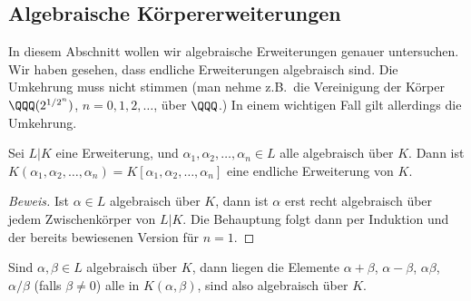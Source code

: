 \documentclass[12pt,a4paper,twoside]{article}
\begin{document}
\subsection{Algebraische K\"orpererweiterungen}
In diesem Abschnitt wollen wir algebraische Erweiterungen genauer untersuchen.
Wir haben gesehen, dass endliche Erweiterungen algebraisch sind. Die Umkehrung
muss nicht stimmen (man nehme z.B.\ die Vereinigung der K\"orper
$\QQQ(2^{1/2^n})$, $n=0,1,2,\dots$, \"uber $\QQQ$.) In einem wichtigen Fall
gilt allerdings die Umkehrung.
\begin{Lemma}
  Sei $L|K$ eine Erweiterung, und $\alpha_1,\alpha_2,\dots,\alpha_n\in L$ alle
  algebraisch \"uber $K$. Dann ist
  $K(\alpha_1,\alpha_2,\dots,\alpha_n)=K[\alpha_1,\alpha_2,\dots,\alpha_n]$
  eine endliche Erweiterung von $K$.
\end{Lemma}
\begin{proof}[Beweis]
  Ist $\alpha\in L$ algebraisch \"uber $K$, dann ist $\alpha$ erst recht
  algebraisch \"uber jedem Zwischenk\"orper von $L|K$. Die Behauptung folgt
  dann per Induktion und der bereits bewiesenen Version f\"ur $n=1$.
\end{proof}
Sind $\alpha,\beta\in L$ algebraisch \"uber $K$, dann liegen die Elemente
$\alpha+\beta$, $\alpha-\beta$, $\alpha\beta$, $\alpha/\beta$ (falls
$\beta\ne0$) alle in $K(\alpha,\beta)$, sind also algebraisch \"uber $K$.
\end{document}
